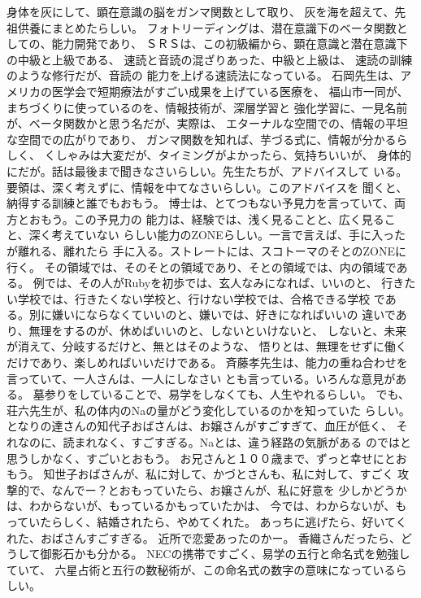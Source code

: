 \documentclass{jsarticle}
\begin{document}
    身体を灰にして、顕在意識の脳をガンマ関数として取り、
    灰を海を超えて、先祖供養にまとめたらしい。
    フォトリーディングは、潜在意識下のベータ関数としての、能力開発であり、
    ＳＲＳは、この初級編から、顕在意識と潜在意識下の中級と上級である、
    速読と音読の混ざりあった、中級と上級は、
    速読の訓練のような修行だが、音読の
    能力を上げる速読法になっている。
    石岡先生は、アメリカの医学会で短期療法がすごい成果を上げている医療を、
    福山市一同が、まちづくりに使っているのを、情報技術が、深層学習と
    強化学習に、一見名前が、ベータ関数かと思う名だが、実際は、
    エターナルな空間での、情報の平坦な空間での広がりであり、
    ガンマ関数を知れば、芋づる式に、情報が分かるらしく、
    くしゃみは大変だが、タイミングがよかったら、気持ちいいが、
    身体的にだが。話は最後まで聞きなさいらしい。先生たちが、アドバイスして
    いる。要領は、深く考えずに、情報を中てなさいらしい。このアドバイスを
    聞くと、納得する訓練と誰でもおもう。
    博士は、とてつもない予見力を言っていて、両方とおもう。この予見力の
    能力は、経験では、浅く見ることと、広く見ること、深く考えていない
    らしい能力のZONEらしい。一言で言えば、手に入ったが離れる、離れたら
    手に入る。ストレートには、スコトーマのそとのZONEに行く。
    その領域では、そのそとの領域であり、そとの領域では、内の領域である。
    例では、その人がRubyを初歩では、玄人なみになれば、いいのと、
    行きたい学校では、行きたくない学校と、行けない学校では、合格できる学校
    である。別に嫌いにならなくていいのと、嫌いでは、好きになればいいの
    違いであり、無理をするのが、休めばいいのと、しないといけないと、
    しないと、未来が消えて、分岐するだけと、無とはそのような、
    悟りとは、無理をせずに働くだけであり、楽しめればいいだけである。
    斉藤孝先生は、能力の重ね合わせを言っていて、一人さんは、一人にしなさい
    とも言っている。いろんな意見がある。
    墓参りをしていることで、易学をしなくても、人生やれるらしい。
        でも、荘六先生が、私の体内のNaの量がどう変化しているのかを知っていた
    らしい。
    となりの達さんの知代子おばさんは、お嬢さんがすごすぎて、血圧が低く、
    それなのに、読まれなく、すごすぎる。Naとは、違う経路の気脈がある
    のではと思うしかなく、すごいとおもう。
    お兄さんと１００歳まで、ずっと幸せにとおもう。
    知世子おばさんが、私に対して、かづとさんも、私に対して、すごく
    攻撃的で、なんでー？とおもっていたら、お嬢さんが、私に好意を
    少しかどうかは、わからないが、もっているかもっていたかは、
    今では、わからないが、もっていたらしく、結婚されたら、やめてくれた。
    あっちに逃げたら、好いてくれた、おばさんすごすぎる。
    近所で恋愛あったのかー。
    香織さんだったら、どうして御影石かも分かる。
    NECの携帯ですごく、易学の五行と命名式を勉強していて、
    六星占術と五行の数秘術が、この命名式の数字の意味になっているらしい。
\end{document}
